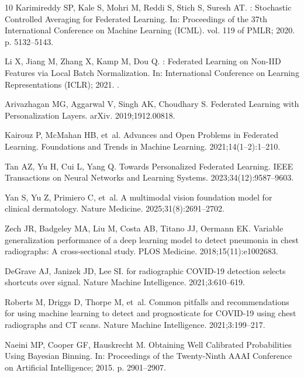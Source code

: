 \documentclass[VANCOUVER,Times1COL]{WileyNJDv5}
\begin{document}
\begin{thebibliography}{10}
Karimireddy SP, Kale S, Mohri M, Reddi S, Stich S, Suresh AT.
: Stochastic Controlled Averaging for Federated Learning.
\newblock In: Proceedings of the 37th International Conference on Machine
  Learning (ICML). vol. 119 of PMLR; 2020. p. 5132--5143.

Li X, Jiang M, Zhang X, Kamp M, Dou Q.
: Federated Learning on Non-{IID} Features via Local Batch
  Normalization.
\newblock In: International Conference on Learning Representations (ICLR);
  2021. .

Arivazhagan MG, Aggarwal V, Singh AK, Choudhary S.
\newblock Federated Learning with Personalization Layers.
\newblock arXiv. 2019;1912.00818.

Kairouz P, McMahan HB, et~al.
\newblock Advances and Open Problems in Federated Learning.
\newblock Foundations and Trends in Machine Learning. 2021;14(1--2):1--210.

Tan AZ, Yu H, Cui L, Yang Q.
\newblock Towards Personalized Federated Learning.
\newblock IEEE Transactions on Neural Networks and Learning Systems.
  2023;34(12):9587--9603.

Yan S, Yu Z, Primiero C, et~al.
\newblock A multimodal vision foundation model for clinical dermatology.
\newblock Nature Medicine. 2025;31(8):2691--2702.

Zech JR, Badgeley MA, Liu M, Costa AB, Titano JJ, Oermann EK.
\newblock Variable generalization performance of a deep learning model to
  detect pneumonia in chest radiographs: A cross-sectional study.
\newblock PLOS Medicine. 2018;15(11):e1002683.

DeGrave AJ, Janizek JD, Lee SI.
 for radiographic {COVID-19} detection selects shortcuts over
  signal.
\newblock Nature Machine Intelligence. 2021;3:610--619.

Roberts M, Driggs D, Thorpe M, et~al.
\newblock Common pitfalls and recommendations for using machine learning to
  detect and prognosticate for {COVID-19} using chest radiographs and {CT}
  scans.
\newblock Nature Machine Intelligence. 2021;3:199--217.

Naeini MP, Cooper GF, Hauskrecht M.
\newblock Obtaining Well Calibrated Probabilities Using {B}ayesian Binning.
\newblock In: Proceedings of the Twenty-Ninth AAAI Conference on Artificial
  Intelligence; 2015. p. 2901--2907.


\end{thebibliography}
\end{document}
